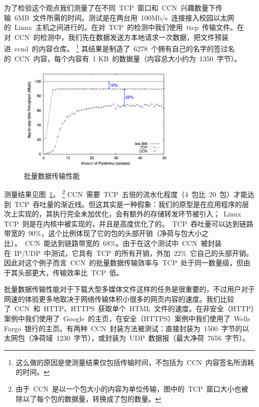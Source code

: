 为了检验这个观点我们测量了在不同~TCP~窗口和~CCN~兴趣数量下传输~6MB~文件所需的时间。测试是在两台用~100Mb/s~连接接入校园以太网的~Linux~主机之间进行的。在对~TCP~的检测中我们使用~ttcp~传输文件。在对~CCN~的检测中，我们先在数据发送方本地请求一次数据，把文件预装进~ccnd~的内容仓库。
\renewcommand\baselinestretch{1} %
\footnote{这么做的原因是使测量结果仅包括传输时间，不包括为~CCN~内容签名所消耗的时间。}
其结果是制造了~6278~个拥有自己的名字的签过名的~CCN~内容，每个内容有~1 KB~的数据量（内容总大小约为~1350~字节）。

\begin{figure}[htbp]
\begin{center}
\includegraphics[width=0.7\textwidth]{images/performance}
\caption{批量数据传输性能}
\label{performance}
\end{center}
\end{figure}

测量结果见图~\ref{performance}。
\renewcommand\baselinestretch{1} %
\footnote{由于~CCN~是以一个包大小的内容为单位传输，图中的~TCP~窗口大小也被除以了每个包的数据量，转换成了包的数量。}
CCN~需要~TCP~五倍的流水化程度（4~包比~20~包）才能达到~TCP~吞吐量的渐近线。但这其实是一种假象：我们的原型是在应用程序的层次上实现的，其执行完全未加优化，会有额外的存储转发环节被引入；~Linux TCP~则是在内核中被实现的，并且是高度优化了的。~TCP~吞吐量可以达到链路带宽的~90\%，这个比例体现了它的包的头部开销（净荷与包大小之比）。~CCN~能达到链路带宽的~68\%。由于在这个测试中~CCN~被封装在~IP/UDP~中测试，它具有~TCP~的所有开销，外加~22\%~它自己的头部开销。因此对这个例子而言~CCN~的批量数据传输效率与~TCP~处于同一数量级，但由于其头部更大，传输效率比~TCP~低。

批量数据传输性能对于下载大型多媒体文件这样的任务是很重要的，不过用户对于网速的体验更多地取决于网络传输体积小很多的网页内容的速度。我们比较了~CCN~和~HTTP、HTTPS~获取单个~HTML~文件的速度。在非安全（HTTP）案例中我们使用了~Google~的主页，在安全（HTTPS）案例中我们使用了~Wells Fargo~银行的主页。有两种~CCN~封装方法被测试：直接封装为~1500~字节的以太网包（净荷域~1230~字节），或封装为~UDP~数据报（最大净荷~7656~字节）。

